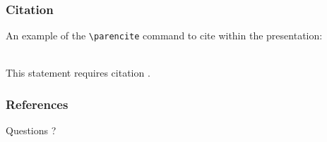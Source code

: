 \documentclass[french]{beamer}
\begin{document}
\begin{frame}[fragile] %
\frametitle{Citation}
An example of the \verb|\parencite| command to cite within the presentation:\\~

This statement requires citation \parencite{Ganter1999}.
\end{frame}

\begin{frame}
\frametitle{References}
\printbibliography
\end{frame}
\begin{frame}
\Huge{\centerline{Questions ?}}
\end{frame}
\end{document}
